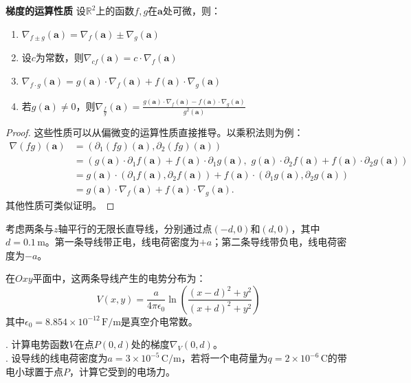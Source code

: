 \documentclass[12pt,UTF8]{ctexbook}
\begin{document}
\begin{tm}{\textbf{梯度的运算性质}}
设$\mathbb{R}^2$上的函数$f, g$在$\mathbf{a}$处可微，则：
\begin{enumerate}[label=\arabic*.]
\item $\nabla_{f \pm g}(\mathbf{a}) = \nabla_f(\mathbf{a}) \pm \nabla_g(\mathbf{a})$
\item 设$c$为常数，则$\nabla_{cf}(\mathbf{a}) = c\cdot \nabla_f(\mathbf{a})$
\item $\nabla_{f\cdot g}(\mathbf{a}) = g(\mathbf{a})\cdot \nabla_f(\mathbf{a}) + f(\mathbf{a})\cdot \nabla_g(\mathbf{a})$
\item 若$g(\mathbf{a}) \neq 0$，则$\displaystyle\nabla_{\frac{f}{g}}(\mathbf{a}) = \frac{g(\mathbf{a})\cdot \nabla_f(\mathbf{a}) - f(\mathbf{a})\cdot \nabla_g(\mathbf{a})}{g^2(\mathbf{a})}$
\end{enumerate}
\end{tm}
\begin{proof}
这些性质可以从偏微变的运算性质直接推导。以乘积法则为例：
\begin{align*}
\nabla(fg)(\mathbf{a}) &= (\partial_1(fg)(\mathbf{a}), \partial_2(fg)(\mathbf{a})) \\
&= (g(\mathbf{a})\cdot \partial_1 f(\mathbf{a}) + f(\mathbf{a})\cdot \partial_1 g(\mathbf{a}),\,\, g(\mathbf{a})\cdot \partial_2 f(\mathbf{a}) + f(\mathbf{a})\cdot \partial_2 g(\mathbf{a})) \\
&= g(\mathbf{a})\cdot (\partial_1 f(\mathbf{a}), \partial_2 f(\mathbf{a})) + f(\mathbf{a})\cdot (\partial_1 g(\mathbf{a}), \partial_2 g(\mathbf{a})) \\
&= g(\mathbf{a})\cdot \nabla_f(\mathbf{a}) + f(\mathbf{a})\cdot \nabla_g(\mathbf{a}).
\end{align*}
其他性质可类似证明。
\end{proof}

\begin{et}
考虑两条与$z$轴平行的无限长直导线，分别通过点$(-d,0)$和$(d,0)$，其中$d=0.1\,\mathrm{m}$。第一条导线带正电，线电荷密度为$+a$；第二条导线带负电，线电荷密度为$-a$。

在$Oxy$平面中，这两条导线产生的电势分布为：
$$ V(x,y) = \frac{a}{4\pi\epsilon_0} \ln\left(\frac{(x-d)^2+y^2}{(x+d)^2+y^2}\right) $$
其中$\epsilon_0 = 8.854\times10^{-12}\,\mathrm{F/m}$是真空介电常数。

. 计算电势函数$V$在点$P(0,d)$处的梯度$\nabla_V(0,d)$。\\
. 设导线的线电荷密度为$a=3\times10^{-5}\,\mathrm{C/m}$，若将一个电荷量为$q=2\times10^{-6}\,\mathrm{C}$的带电小球置于点$P$，计算它受到的电场力。
\end{et}
\end{document}
